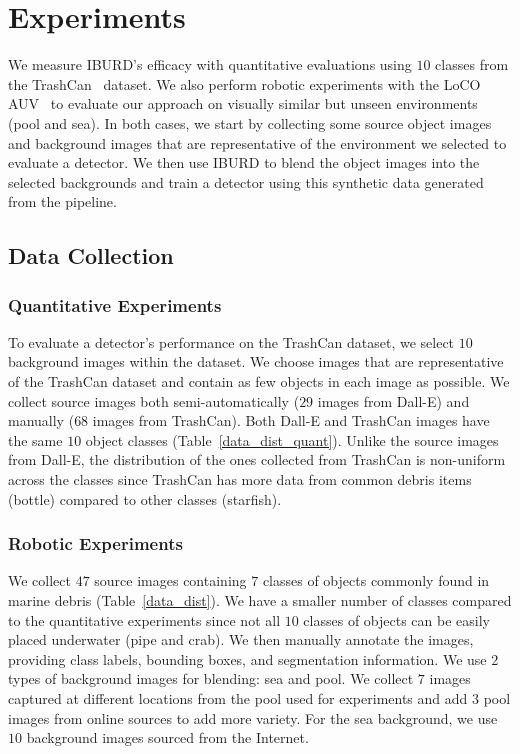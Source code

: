 \section{Experiments}
\label{sec:experiments}


We measure IBURD's efficacy with quantitative evaluations using $10$ classes from the TrashCan~\cite{hong2020trashcan} dataset. We also perform robotic experiments with the LoCO AUV~\cite{loco_paper_2020} to evaluate our approach on visually similar but unseen environments (\eg pool and sea).
In both cases, we start by collecting some source object images and background images that are representative of the environment we selected to evaluate a detector. 
We then use IBURD to blend the object images into the selected backgrounds and train a detector using this synthetic data generated from the pipeline.




\subsection{Data Collection}
\subsubsection{Quantitative Experiments}
To evaluate a detector's performance on the TrashCan dataset, we select $10$ background images within the dataset. 
We choose images that are representative of the TrashCan dataset and contain as few objects in each image as possible. 
We collect source images both semi-automatically ($29$ images from Dall-E) and manually ($68$ images from TrashCan). 
Both Dall-E and TrashCan images have the same $10$ object classes  (Table~\ref{data_dist_quant}).
Unlike the source images from Dall-E, the distribution of the ones collected from TrashCan is non-uniform across the classes since TrashCan has more data from common debris items (\eg bottle) compared to other classes (\eg starfish).


\subsubsection{Robotic Experiments}
We collect $47$ source images containing $7$ classes of objects commonly found in marine debris (Table~\ref{data_dist}). We have a smaller number of classes compared to the quantitative experiments since not all $10$ classes of objects can be easily placed underwater (\eg pipe and crab).
We then manually annotate the images, providing class labels, bounding boxes, and segmentation information.
We use $2$ types of background images for blending: sea and pool. 
We collect $7$ images captured at different locations from the pool used for experiments and add $3$ pool images from online sources to add more variety. 
For the sea background, we use $10$ background images sourced from the Internet. 



